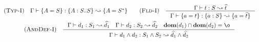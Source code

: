 \begin{minipage}{\textwidth} \[\begin{array}{c}
    \RULE{Typ-I} \quad
        \TJ{\Gamma}{\DEF{A}{S}}{\TDEC{A}{S}{S}}{\DEF{A}{\TRANS{S}}}
    \qquad

    \RULE{Fld-I} \quad \inference{
        \TJ{\Gamma}{t}{S}{\HAT{t}}
    }{
        \TJ{\Gamma}{\DEF{a}{t}}{\FDEC{a}{S}}{\DEF{a}{\HAT{t}}}
    } \\[4mm]

    \RULE{AndDef-I} \quad \inference{
        \TJ{\Gamma}{d_1}{S_1}{\HAT{d_1}} \quad
        \TJ{\Gamma}{d_2}{S_2}{\HAT{d_2}} \quad
        \DOM{d_1} \cap \DOM{d_2} = \o
    }{
        \TJ{\Gamma}{\AGG{d_1}{d_2}}{\AGG{S_1}{S_2}}{\AGG{\HAT{d_1}}{\HAT{d_2}}}
    }
\end{array}\] \end{minipage}
